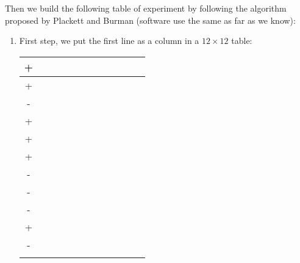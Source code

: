 		Then we build the following table of experiment by following the algorithm proposed by Plackett and Burman (software use the same as far as we know):
	\begin{enumerate}
		\item First step, we put the first line as a column in a $12\times 12$ table:
		 
		\begin{table}[H]
		\begin{center}
			\begin{tabular}{|c|c|c|c|c|c|c|c|c|c|c|c|}
			\hline 
			+ & {} & {} & {} & {} & {} & {} & {} & {} & {} & {} & {} \\ 
			\hline 
			+ & {} & {} & {} & {} & {} & {} & {} & {} & {} & {} & {} \\ 
			\hline 
			- & {} & {} & {} & {} & {} & {} & {} & {} & {} & {} & {} \\ 
			\hline 
			+ & {} & {} & {} & {} & {} & {} & {} & {} & {} & {} & {} \\ 
			\hline 
			+ & {} & {} & {} & {} & {} & {} & {} & {} & {} & {} & {} \\ 
			\hline 
			+ & {} & {} & {} & {} & {} & {} & {} & {} & {} & {} & {} \\ 
			\hline 
			- & {} & {} & {} & {} & {} & {} & {} & {} & {} & {} & {} \\ 
			\hline 
			- & {} & {} & {} & {} & {} & {} & {} & {} & {} & {} & {} \\ 
			\hline 
			- & {} & {} & {} & {} & {} & {} & {} & {} & {} & {} & {} \\ 
			\hline 
			+ & {} & {} & {} & {} & {} & {} & {} & {} & {} & {} & {} \\ 
			\hline 
			- & {} & {} & {} & {} & {} & {} & {} & {} & {} & {} & {} \\ 
			\hline 
			{} & {} & {} & {} & {} & {} & {} & {} & {} & {} & {} & {} \\ 
			\hline 
			\end{tabular}
		\end{center}
		\end{table}	
		

\end{enumerate}
